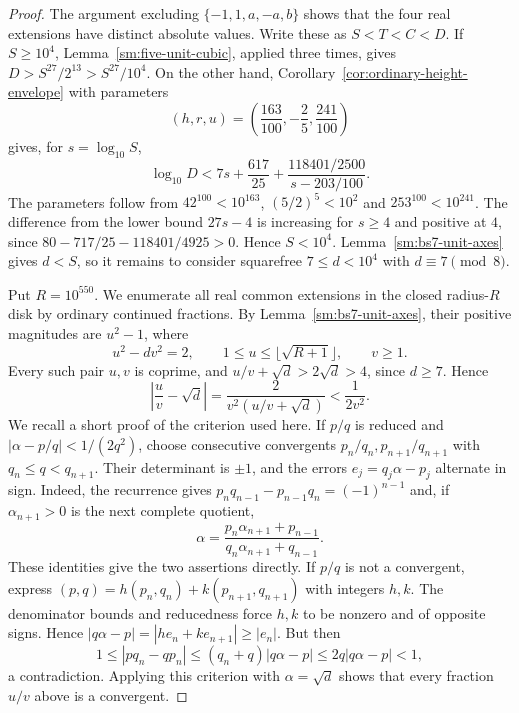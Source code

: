 \begin{proof}
The argument excluding $\{-1,1,a,-a,b\}$ shows that the four real extensions have distinct absolute values. Write these as $S<T<C<D$. If $S\ge10^4$, Lemma~\ref{sm:five-unit-cubic}, applied three times, gives $D>S^{27}/2^{13}>S^{27}/10^4$. On the other hand, Corollary~\ref{cor:ordinary-height-envelope} with parameters
\[
 (h,r,u)=\left(\frac{163}{100},-\frac25,\frac{241}{100}\right)
\]
gives, for $s=\log_{10}S$,
\[
 \log_{10}D<7s+\frac{617}{25}
       +\frac{118401/2500}{s-203/100}.
\]
The parameters follow from $42^{100}<10^{163}$, $(5/2)^5<10^2$ and $253^{100}<10^{241}$. The difference from the lower bound $27s-4$ is increasing for $s\ge4$ and positive at $4$, since
$80-717/25-118401/4925>0$. Hence $S<10^4$.
Lemma~\ref{sm:bs7-unit-axes} gives $d<S$, so it remains to consider squarefree $7\le d<10^4$ with $d\equiv7\pmod8$.

Put $R=10^{550}$. We enumerate all real common extensions in the closed radius-$R$ disk by ordinary continued fractions. By Lemma~\ref{sm:bs7-unit-axes}, their positive magnitudes are $u^2-1$, where
\begin{equation*}
 u^2-dv^2=2,\qquad
 1\le u\le\lfloor\sqrt{R+1}\rfloor,\qquad v\ge1.
\end{equation*}
Every such pair $u,v$ is coprime, and
$u/v+\sqrt d>2\sqrt d>4$, since $d\ge7$. Hence
\begin{equation*}
 \left|\frac uv-\sqrt d\right|
 =\frac{2}{v^2(u/v+\sqrt d)}<\frac1{2v^2}.
\end{equation*}
We recall a short proof of the criterion used here. If $p/q$ is reduced
and $|\alpha-p/q|<1/(2q^2)$, choose consecutive convergents
$p_n/q_n,p_{n+1}/q_{n+1}$ with $q_n\le q<q_{n+1}$.
Their determinant is $\pm1$, and the errors
$e_j=q_j\alpha-p_j$ alternate in sign. Indeed, the recurrence gives
$p_nq_{n-1}-p_{n-1}q_n=(-1)^{n-1}$ and, if
$\alpha_{n+1}>0$ is the next complete quotient,
\[
 \alpha=\frac{p_n\alpha_{n+1}+p_{n-1}}
 {q_n\alpha_{n+1}+q_{n-1}}.
\]
These identities give the two assertions directly. If $p/q$ is not a convergent, express
$(p,q)=h(p_n,q_n)+k(p_{n+1},q_{n+1})$ with integers $h,k$.
The denominator bounds and reducedness force $h,k$ to be nonzero
and of opposite signs. Hence
$|q\alpha-p|=|h e_n+k e_{n+1}|\ge|e_n|$. But then
\[
 1\le|p q_n-q p_n|
 \le(q_n+q)|q\alpha-p|\le2q|q\alpha-p|<1,
\]
a contradiction. Applying this criterion with $\alpha=\sqrt d$
shows that every fraction $u/v$ above is a convergent.


\end{proof}
